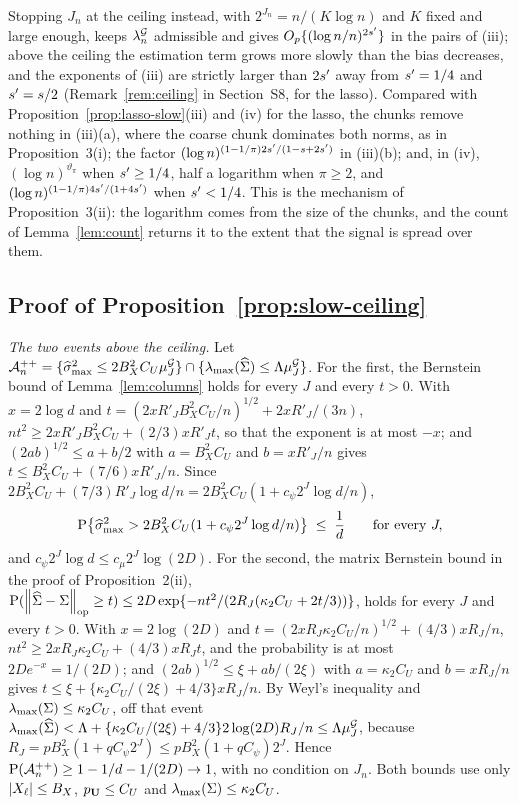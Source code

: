 Stopping $J_n$ at the ceiling instead, with $2^{J_n} = n/(K\log n)$ and $K$
fixed and large enough, keeps $\lambda^{\mathcal{G}}_{n}$ admissible and gives
$O_p\{(\log n/n)^{2s'}\}$ in the pairs of (iii); above the ceiling the
estimation term grows more slowly than the bias decreases, and the exponents
of (iii) are strictly larger than $2s'$ away from $s' = 1/4$ and
$s' = s/2$ (Remark~\ref{rem:ceiling} in Section~S8, for the lasso). Compared
with Proposition~\ref{prop:lasso-slow}(iii) and (iv) for the lasso, the chunks
remove nothing in (iii)(a), where the coarse chunk dominates both norms, as in
Proposition~3(i); the factor $(\log n)^{(1-1/\pi)2s'/(1-s+2s')}$ in
(iii)(b); and, in (iv), $(\log n)^{\vartheta_{\pi}}$ when $s' \ge 1/4$, half
a logarithm when $\pi \ge 2$, and $(\log n)^{(1-1/\pi)4s'/(1+4s')}$ when
$s' < 1/4$. This is the mechanism of Proposition~3(ii): the logarithm comes
from the size of the chunks, and the count of Lemma~\ref{lem:count} returns it
to the extent that the signal is spread over them.

\subsection*{Proof of Proposition~\ref{prop:slow-ceiling}}

\emph{The two events above the ceiling.} Let
$\mathcal{A}_{n}^{++} = \{\widehat{\sigma}_{\max}^{2} \le 2B_X^{2}C_U\mu^{\mathcal{G}}_{J}\}\cap
\{\lambda_{\max}(\widehat{\Sigma}) \le \Lambda\mu^{\mathcal{G}}_{J}\}$. For the first, the Bernstein
bound of Lemma~\ref{lem:columns} holds for every $J$ and every $t > 0$. With
$x = 2\log d$ and $t = (2xR'_JB_X^{2}C_U/n)^{1/2} + 2xR'_J/(3n)$,
$nt^{2} \ge 2xR'_JB_X^{2}C_U + (2/3)xR'_Jt$, so that the exponent is at most
$-x$; and $(2ab)^{1/2} \le a + b/2$ with $a = B_X^{2}C_U$ and $b = xR'_J/n$
gives $t \le B_X^{2}C_U + (7/6)xR'_J/n$. Since
$2B_X^{2}C_U + (7/3)R'_J\log d/n = 2B_X^{2}C_U(1 + c_{\psi}2^{J}\log d/n)$,
\begin{equation}
  \label{eq:smax-ceiling}
  \mathrm{P}\bigl\{\widehat{\sigma}_{\max}^{2} > 2B_X^{2}C_U(1 + c_{\psi}2^{J}\log d/n)\bigr\}
  \;\le\; \frac{1}{d}
  \qquad\text{for every } J,
\end{equation}
and $c_{\psi}2^{J}\log d \le c_{\mu}2^{J}\log(2D)$. For the second, the matrix
Bernstein bound in the proof of Proposition~2(ii),
$\mathrm{P}(\left\lVert \widehat{\Sigma}-\Sigma \right\rVert_{\mathrm{op}} \ge t) \le
2D\exp\{-nt^{2}/(2R_J(\kappa_2C_U + 2t/3))\}$, holds for every $J$ and every
$t > 0$. With $x = 2\log(2D)$ and
$t = (2xR_J\kappa_2C_U/n)^{1/2} + (4/3)xR_J/n$,
$nt^{2} \ge 2xR_J\kappa_2C_U + (4/3)xR_Jt$, and the probability is at most
$2De^{-x} = 1/(2D)$; and $(2ab)^{1/2} \le \xi + ab/(2\xi)$ with
$a = \kappa_2C_U$ and $b = xR_J/n$ gives
$t \le \xi + \{\kappa_2C_U/(2\xi) + 4/3\}xR_J/n$. By Weyl's inequality and
$\lambda_{\max}(\Sigma) \le \kappa_2C_U$, off that event
$\lambda_{\max}(\widehat{\Sigma}) < \Lambda + \{\kappa_2C_U/(2\xi) + 4/3\}2\log(2D)R_J/n \le
\Lambda\mu^{\mathcal{G}}_{J}$, because
$R_J = pB_X^{2}(1 + qC_\psi2^{J}) \le pB_X^{2}(1+qC_\psi)2^{J}$. Hence
$\mathrm{P}(\mathcal{A}_{n}^{++}) \ge 1 - 1/d - 1/(2D) \to 1$, with no condition on $J_n$.
Both bounds use only $|X_{\ell}| \le B_X$, $p_{\mathbf{U}} \le C_U$ and
$\lambda_{\max}(\Sigma) \le \kappa_2C_U$.

